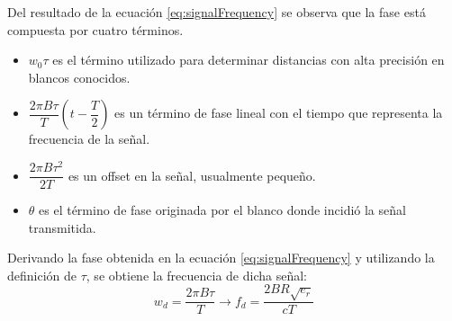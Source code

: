 Del resultado de la ecuación \ref{eq:signalFrequency} se observa que la fase está compuesta por cuatro términos.
\begin{itemize}
	\item $w_0\tau$ es el término utilizado para determinar distancias con alta precisión en blancos conocidos. 
	\item $\dfrac{2\pi B\tau}{T}(t - \dfrac{T}{2})$ es un término de fase lineal con el tiempo que representa la frecuencia de la 
		señal.
	\item $\dfrac{2\pi B\tau^2}{2T}$ es un offset en la señal, usualmente pequeño.
	\item $\theta$ es el término de fase originada por el blanco donde incidió la señal transmitida. 
\end{itemize}

Derivando la fase obtenida en la ecuación \ref{eq:signalFrequency} y utilizando la definición de $\tau$, se obtiene la 
frecuencia de dicha señal:
\begin{equation}
	w_d = \dfrac{2\pi B\tau}{T} \rightarrow f_d = \dfrac{2BR\sqrt{e_r}}{cT}
\end{equation}


